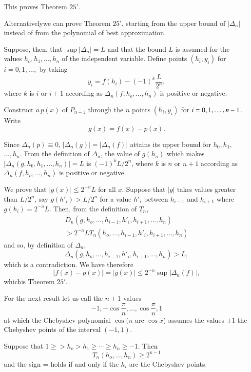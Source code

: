 This proves Theorem $25'$.

Alternatively\pageoriginale we can prove Theorem $25'$, starting from the upper
bound of $|\Delta_n |$ instead of from  the polynomial of best
approximation. 

Suppose, then,  that $ \sup | \Delta_n| =L$ and that the bound $L$ is
assumed for the values $h_o, h_1, \ldots,  h_n$ of the independent
variable. Define points $(h_i,  y_i) $ for $i=0, 1, \ldots, $ by
taking  
$$
y_i = f(h_i) -(-1)^k \frac{L}{2^n},
$$
where $k$ is $i$ or $i+1$ according as $\Delta_n (f,h_o,  \ldots, 
h_n)$ is positive or negative. 

Construct $a \,p(x)$ of $P_{n-1}$ through the $n$ points $(h_i, y_i)$
for $i=0, 1, \dots,\break  n-1$. Write  
$$
g(x)= f(x)- p(x).
$$

Since $\Delta_n (p) \equiv 0$, $|  \Delta_n (g) | = | \Delta_n (f) |$
attains its upper bound for $h_0, h_1$, $\ldots,  h_n$. From  the
definition of $\Delta_n$, the value of $g(h_n)$ which makes $|
\Delta_n (g, h_0, h_1, \ldots,  h_n) | = L$ is $(-1)^k L/2^n$, where
$k$ is $n$ or $n+1$ according as $\Delta_n (f, h_o, \ldots,  h_n)$ is
positive or negative. 

We prove that $|g(x)| \le 2^{-n} L$ for all $x$. Suppose that $|g|$
takes values greater than $L/2^n$, say $g(h'_i) > L/2^n$ for a value
$h'_i$ between $h_{i-1}$ and $h_{i+1}$ where $g(h_i)= 2^{-n}L$. Then,
from the definition of $T_n$, 
\begin{multline*}
  D_n(g, h_o, \ldots,  h_{i-1}, h'_i, h_{i+1}, \ldots,  h_n)\\ 
  > 2^{-n} LT_n (h_o, \ldots,  h_{i-1}, h'_i, h_{i+1}, \ldots,  h_n) 
\end{multline*}
and so, by definition of $\Delta_n$,
$$
\Delta_n (g,h_o, \ldots,  h_{i-1}, h'_i, h_{i+1}, \ldots,  h_n) > L,
$$
which is a contradiction. We have therefore
$$
|f(x) - p(x) | =|g(x) | \le 2^{-n} \sup | \Delta_n (f) |, 
$$
which\pageoriginale is Theorem $25'$.

For the next result let us call the $n+1$ values
$$
-1, - \cos \frac{\pi}{n}, \ldots,  \cos \frac{\pi}{n}, 1
$$
at which the Chebyshev polynomial $\cos (n$ arc $ \cos x$) assumes the
values $\pm 1$ the Chebyshev points of the interval $(-1, 1)$. 

\begin{theorem}\label{chap6:sec16:thm26}  %
  Suppose that $1 \ge >h_o > h_1 \ge \cdots \ge h_n \ge -1$. Then
    $$
    T_n(h_o, \ldots,  h_n) \ge 2^{n-1}
    $$
    and the sign = holds if and only if the $h_i$ are the Chebyshev points.
\end{theorem}

